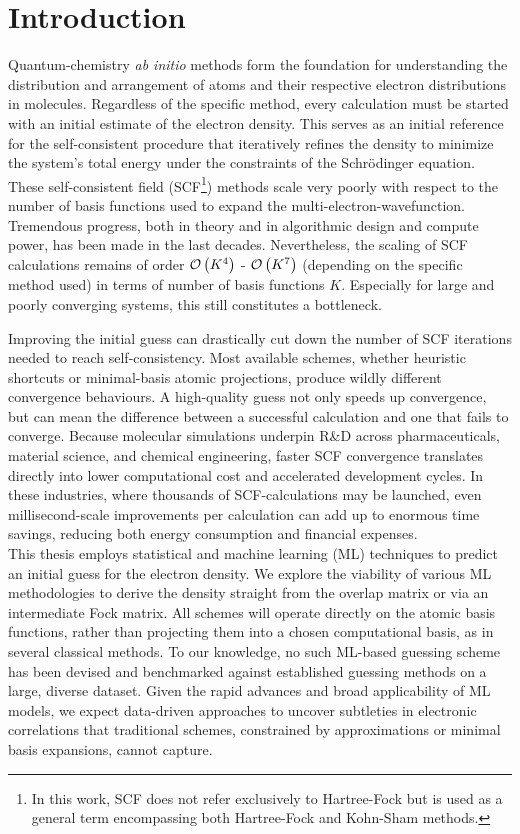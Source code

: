 \chapter{Introduction}
\label{sec:introduction}

Quantum-chemistry \textit{ab initio} methods form the foundation for understanding the distribution and arrangement of atoms and their respective electron distributions in molecules. Regardless of the specific method, every calculation must be started with an initial estimate of the electron density. This serves as an initial reference for the self-consistent procedure that iteratively refines the density to minimize the system's total energy under the constraints of the Schrödinger equation. These self-consistent field (SCF\footnote{In this work, SCF does not refer exclusively to Hartree-Fock but is used as a general term encompassing both Hartree-Fock and Kohn-Sham methods.}) methods scale very poorly with respect to the number of basis functions used to expand the multi-electron-wavefunction. Tremendous progress, both in theory and in algorithmic design and compute power, has been made in the last decades. Nevertheless, the scaling of SCF calculations remains of order $\mathcal{O}\left(K^4\right)$ - $\mathcal{O}\left(K^7\right)$ (depending on the specific method used) in terms of number of basis functions $K$. Especially for large and poorly converging systems, this still constitutes a bottleneck. 

Improving the initial guess can drastically cut down the number of SCF iterations needed to reach self-consistency. Most available schemes, whether heuristic shortcuts or minimal-basis atomic projections, produce wildly different convergence behaviours. A high-quality guess not only speeds up convergence, but can mean the difference between a successful calculation and one that fails to converge. Because molecular simulations underpin R\&D across pharmaceuticals, material science, and chemical engineering, faster SCF convergence translates directly into lower computational cost and accelerated development cycles. In these industries, where thousands of SCF-calculations may be launched, even millisecond-scale improvements per calculation can add up to enormous time savings, reducing both energy consumption and financial expenses. \\
This thesis employs statistical and machine learning (ML) techniques to predict an initial guess for the electron density. We explore the viability of various ML methodologies to derive the density straight from the overlap matrix or via an intermediate Fock matrix. All schemes will operate directly on the atomic basis functions, rather than projecting them into a chosen computational basis, as in several classical methods. To our knowledge, no such ML-based guessing scheme has been devised and benchmarked against established guessing methods on a large, diverse dataset. Given the rapid advances and broad applicability of ML models, we expect data-driven approaches to uncover subtleties in electronic correlations that traditional schemes, constrained by approximations or minimal basis expansions, cannot capture.

